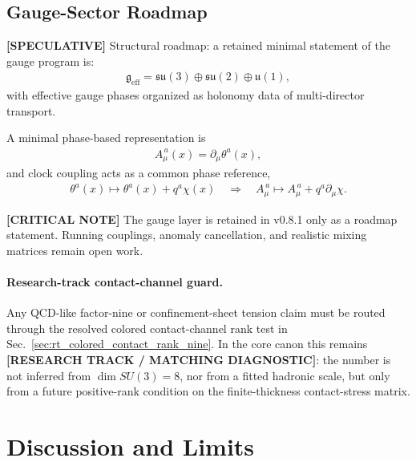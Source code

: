 \documentclass[11pt]{article}
\theoremstyle{definition}
\theoremstyle{plain}
\theoremstyle{remark}
\begin{document}
    \subsection{Gauge-Sector Roadmap}
        \label{subsec:integration_gauge}

        \textbf{[SPECULATIVE]} Structural roadmap: a retained minimal statement of the gauge program is:
        \begin{align}
            \mathfrak{g}_{\mathrm{eff}}
            =
            \mathfrak{su}(3)\oplus\mathfrak{su}(2)\oplus\mathfrak{u}(1),
        \end{align}
        with effective gauge phases organized as holonomy data of multi-director transport.

        A minimal phase-based representation is
        \begin{align}
            A_\mu^{\,a}(x) = \partial_\mu \theta^a(x),
            \label{eq:gauge_phase_potential}
        \end{align}
        and clock coupling acts as a common phase reference,
        \begin{align}
            \theta^a(x) \mapsto \theta^a(x) + q^a \chi(x)
            \quad\Rightarrow\quad
            A_\mu^{\,a} \mapsto A_\mu^{\,a} + q^a \partial_\mu \chi.
            \label{eq:gauge_clock_shift}
        \end{align}

        \textbf{[CRITICAL NOTE]} The gauge layer is retained in v0.8.1 only as a roadmap statement. Running couplings,
        anomaly cancellation, and realistic mixing matrices remain open work.

        \paragraph{Research-track contact-channel guard.}
        Any QCD-like factor-nine or confinement-sheet tension claim must be routed through the resolved colored contact-channel rank test in Sec.~\ref{sec:rt_colored_contact_rank_nine}.  In the core canon this remains \textbf{[RESEARCH TRACK / MATCHING DIAGNOSTIC]}: the number is not inferred from \(\dim SU(3)=8\), nor from a fitted hadronic scale, but only from a future positive-rank condition on the finite-thickness contact-stress matrix.

    \section{Discussion and Limits}
        \label{sec:discussion}
\end{document}
